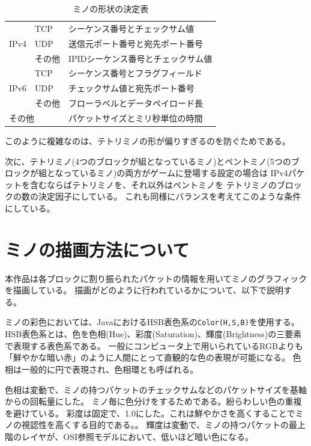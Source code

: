 \documentclass[11pt,a4paper]{jsarticle}
\begin{document}
\begin{table}[htbp]
\begin{center}
\caption{ミノの形状の決定表}
\begin{tabular}{|l|l|l|}
\hline
\multirow{3}{*}{IPv4} & TCP &シーケンス番号とチェックサム値 \\ \cline{2-3}
& UDP & 送信元ポート番号と宛先ポート番号 \\ \cline{2-3}
& その他 & IPIDシーケンス番号とチェックサム値 \\ \hline
\multirow{3}{*}{IPv6} & TCP & シーケンス番号とフラグフィールド \\ \cline{2-3}
& UDP & チェックサム値と宛先ポート番号  \\ \cline{2-3}
& その他 & フローラベルとデータペイロード長 \\ \hline
\multicolumn{2}{|l|}{その他} &  パケットサイズとミリ秒単位の時間 \\ \hline
\end{tabular}

\end{center}
\end{table}

このように複雑なのは、テトリミノの形が偏りすぎるのを防ぐためである。

次に、テトリミノ(4つのブロックが組となっているミノ)とペントミノ(5つのブロックが組となっているミノ)の両方がゲームに登場する設定の場合は
IPv4パケットを含むならばテトリミノを、それ以外はペントミノを テトリミノのブロックの数の決定因子にしている。
これも同様にバランスを考えてこのような条件にしている。

\section{ミノの描画方法について}
本作品は各ブロックに割り振られたパケットの情報を用いてミノのグラフィックを描画している。
描画がどのように行われているかについて、以下で説明する。

ミノの彩色においては、JavaにおけるHSB表色系の{\tt Color(H,S,B)}を使用する。
HSB表色系とは、色を色相(Hue)、彩度(Saturation)、輝度(Brightness)の三要素で表現する表色系である。
一般にコンピュータ上で用いられているRGBよりも「鮮やかな暗い赤」のように人間にとって直観的な色の表現が可能になる。
色相は一般的に円で表現され、色相環とも呼ばれる。

色相は変動で、ミノの持つパケットのチェックサムなどのパケットサイズを基軸からの回転量にした。
ミノ毎に色分けをするためである。紛らわしい色の重複を避けている。
彩度は固定で、1.0にした。これは鮮やかさを高くすることでミノの視認性を高くする目的である。。
輝度は変動で、ミノの持つパケットの最上階のレイヤが、OSI参照モデルにおいて、低いほど暗い色になる。
\end{document}
